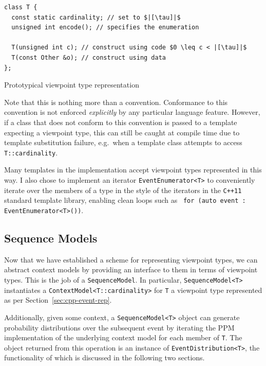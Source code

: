 \documentclass[12pt,a4paper,twoside,openright]{report}
\newcommand{\cppi}[1]{{\small \texttt{#1}}}
\begin{document}
\begin{listing}[H]
  \begin{verbatim}
class T {
  const static cardinality; // set to $|[\tau]|$
  unsigned int encode(); // specifies the enumeration

  T(unsigned int c); // construct using code $0 \leq c < |[\tau]|$
  T(const Other &o); // construct using data 
};
  \end{verbatim}
  \caption{Prototypical viewpoint type representation}
  \label{lst:event-rep}
\end{listing}

Note that this is nothing more than a convention. Conformance to this convention
is not enforced \emph{explicitly} by any particular language feature. However,
if a class that does not conform to this convention is passed to a template
expecting a viewpoint type, this can still be caught at compile time due to
template substitution failure, e.g.\ when a template class attempts to access
\cppi{T::cardinality}.

Many templates in the implementation accept viewpoint types represented in this
way. I also chose to implement an iterator \texttt{EventEnumerator<T>} to
conveniently iterate over the members of a type in the style of the iterators in
the \texttt{C++11} standard template library, enabling clean loops such as~
\cppi{for (auto event : EventEnumerator<T>())}.

\subsection{Sequence Models}

Now that we have established a scheme for representing viewpoint types, we can
abstract context models by providing an interface to them in terms of viewpoint
types. This is the job of a \texttt{SequenceModel}. In particular,
\texttt{SequenceModel<T>} instantiates a \texttt{ContextModel<T::cardinality>}
for \texttt{T} a viewpoint type represented as per
Section~\ref{sec:cpp-event-rep}.

Additionally, given some context, a \texttt{SequenceModel<T>} object can
generate probability distributions over the subsequent event by iterating the
PPM implementation of the underlying context model for each member of
\texttt{T}. The object returned from this operation is an instance of
\texttt{EventDistribution<T>}, the functionality of which is discussed
in the following two sections.
\end{document}
